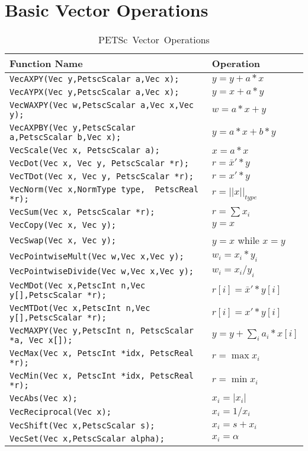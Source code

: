 \section{Basic Vector Operations}
\label{sec_vecbasic}
\begin{table}[tb]
\begin{center}
\begin{tabular}{ll}
{\bf Function Name} & {\bf Operation} \\
\hline
\lstinline|VecAXPY(Vec y,PetscScalar a,Vec x);| & $ y = y + a*x$ \\
\lstinline|VecAYPX(Vec y,PetscScalar a,Vec x);| & $ y = x + a*y$ \\
\lstinline|VecWAXPY(Vec w,PetscScalar a,Vec x,Vec y);| & $ w = a*x + y$ \\
\lstinline|VecAXPBY(Vec y,PetscScalar a,PetscScalar b,Vec x);| & $ y = a*x + b*y$ \\
\lstinline|VecScale(Vec x, PetscScalar a);| & $ x = a*x $ \\
\lstinline|VecDot(Vec x, Vec y, PetscScalar *r);| & $ r = \bar{x}'*y$ \\
\lstinline|VecTDot(Vec x, Vec y, PetscScalar *r);| & $ r = x'*y$ \\
\lstinline|VecNorm(Vec x,NormType type,  PetscReal *r);| & $ r = ||x||_{type}$ \\
\lstinline|VecSum(Vec x, PetscScalar *r);| & $ r = \sum x_{i}$ \\
\lstinline|VecCopy(Vec x, Vec y);| & $ y = x $ \\
\lstinline|VecSwap(Vec x, Vec y);| & $ y = x $ while $ x = y$ \\
\lstinline|VecPointwiseMult(Vec w,Vec x,Vec y);| & $ w_{i} = x_{i}*y_{i} $ \\
\lstinline|VecPointwiseDivide(Vec w,Vec x,Vec y);| & $ w_{i} = x_{i}/y_{i} $ \\
\lstinline|VecMDot(Vec x,PetscInt n,Vec y[],PetscScalar *r);| & $ r[i] = \bar{x}'*y[i]$ \\
\lstinline|VecMTDot(Vec x,PetscInt n,Vec y[],PetscScalar *r);| & $ r[i] = x'*y[i]$ \\
\lstinline|VecMAXPY(Vec y,PetscInt n, PetscScalar *a, Vec x[]);| \hspace{1cm} & $ y = y + \sum_i a_{i}*x[i] $ \\
\lstinline|VecMax(Vec x, PetscInt *idx, PetscReal *r);| & $ r = \max x_{i}$ \\
\lstinline|VecMin(Vec x, PetscInt *idx, PetscReal *r);| & $ r = \min x_{i}$ \\
\lstinline|VecAbs(Vec x);| & $ x_i = |x_{i}|$ \\
\lstinline|VecReciprocal(Vec x);| & $ x_i = 1/x_{i}$ \\
\lstinline|VecShift(Vec x,PetscScalar s);| & $ x_i = s + x_{i}$ \\
\lstinline|VecSet(Vec x,PetscScalar alpha);| & $ x_i = \alpha$ \\
\hline
\end{tabular}
\end{center}
\caption{\hbox{PETSc Vector Operations}}
\label{fig_vectorops}
\end{table}

